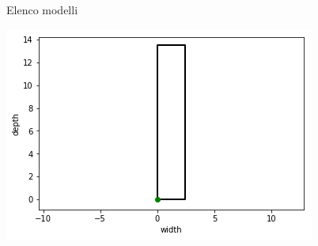 \documentclass{beamer}
\begin{document}
\begin{frame}{Elenco modelli}
\begin{minipage}[c]{0.45\textwidth}
	\end{minipage}
	\hfill
	\begin{minipage}[c]{0.45\textwidth}
		\includegraphics[width=\textwidth]{figures/cartesian_wd}
	\end{minipage}
\end{frame}
\end{document}
